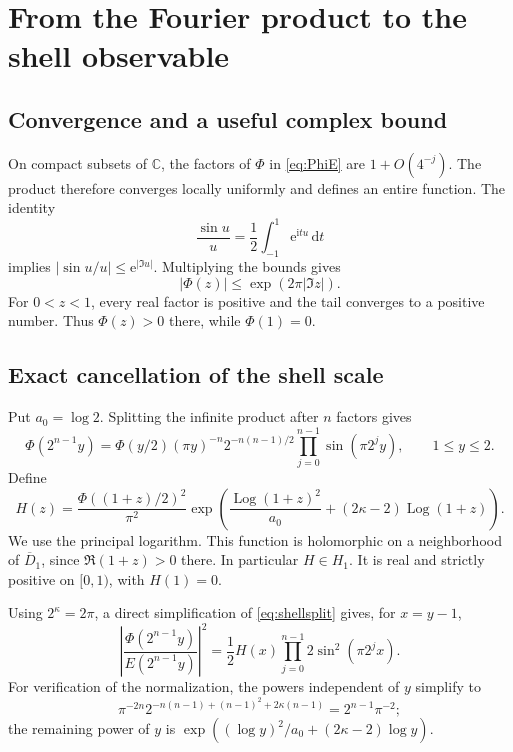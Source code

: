 \documentclass[11pt,a4paper]{article}
\theoremstyle{definition}
\theoremstyle{remark}
\newcommand{\C}{\mathbb C}
\newcommand{\dd}{\,\mathrm d}
\newcommand{\ii}{\mathrm i}
\newcommand{\e}{\mathrm e}
\newcommand{\Log}{\operatorname{Log}}
\newcommand{\abs}[1]{\left|#1\right|}
\numberwithin{equation}{section}
\begin{document}
\section{From the Fourier product to the shell observable}
\label{sec:shell}

\subsection{Convergence and a useful complex bound}
On compact subsets of $\C$, the factors of $\Phi$ in \cref{eq:PhiE} are
$1+O(4^{-j})$. The product therefore converges locally uniformly and defines
an entire function. The identity
\[
 \frac{\sin u}{u}=\frac12\int_{-1}^1\e^{\ii tu}\dd t
\]
implies $|\sin u/u|\le\e^{|\Im u|}$. Multiplying the bounds gives
\begin{equation}
 |\Phi(z)|\le\exp(2\pi|\Im z|).
 \label{eq:phibound}
\end{equation}
For $0<z<1$, every real factor is positive and the tail converges to a
positive number. Thus $\Phi(z)>0$ there, while $\Phi(1)=0$.

\subsection{Exact cancellation of the shell scale}
Put $a_0=\log2$. Splitting the infinite product after $n$ factors gives
\begin{equation}
 \Phi(2^{n-1}y)=
 \Phi(y/2)(\pi y)^{-n}2^{-n(n-1)/2}
 \prod_{j=0}^{n-1}\sin(\pi2^jy),\qquad 1\le y\le2.
 \label{eq:shellsplit}
\end{equation}
Define
\begin{equation}
 \boxed{\displaystyle
 H(z)=\frac{\Phi((1+z)/2)^2}{\pi^2}
 \exp\!\left(
 \frac{\Log(1+z)^2}{a_0}+(2\kappa-2)\Log(1+z)\right).}
 \label{eq:H}
\end{equation}
We use the principal logarithm. This function is holomorphic on a
neighborhood of $\overline D_1$, since $\Re(1+z)>0$ there.
In particular $H\in H_1$. It is real and strictly positive on $[0,1)$,
with $H(1)=0$.

Using $2^\kappa=2\pi$, a direct simplification of
\cref{eq:shellsplit} gives, for $x=y-1$,
\begin{equation}
 \abs{\frac{\Phi(2^{n-1}y)}{E(2^{n-1}y)}}^2
 =\frac12 H(x)\prod_{j=0}^{n-1}2\sin^2(\pi2^jx).
 \label{eq:shellnormalized}
\end{equation}
For verification of the normalization, the powers independent of $y$
simplify to
\[
 \pi^{-2n}2^{-n(n-1)+(n-1)^2+2\kappa(n-1)}
 =2^{n-1}\pi^{-2};
\]
the remaining power of $y$ is
$\exp((\log y)^2/a_0+(2\kappa-2)\log y)$.
\end{document}
